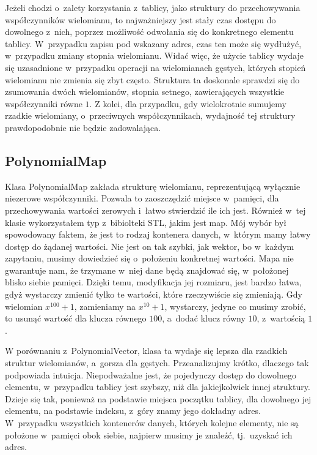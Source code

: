 Jeżeli chodzi o~zalety korzystania z~tablicy, jako struktury do przechowywania współczynników wielomianu, to najważniejszy jest stały czas dostępu do dowolnego z~nich, poprzez możliwość odwołania się do konkretnego elementu tablicy. W~przypadku zapisu pod wskazany adres, czas ten może się wydłużyć, w~przypadku zmiany stopnia wielomianu. Widać więc, że użycie tablicy wydaje się uzasadnione w~przypadku operacji na wielomianach gęstych, których stopień wielomianu nie zmienia się zbyt często. Struktura ta doskonale sprawdzi się do zsumowania dwóch wielomianów, stopnia setnego, zawierających wszystkie współczynniki równe $1$. Z kolei, dla przypadku, gdy wielokrotnie sumujemy rzadkie wielomiany, o~przeciwnych współczynnikach, wydajność tej struktury prawdopodobnie nie będzie zadowalająca.

\subsection{PolynomialMap}

Klasa PolynomialMap zakłada strukturę wielomianu, reprezentującą wyłącznie niezerowe współczynniki.
Pozwala to zaoszczędzić miejsce w~pamięci, dla przechowywania wartości zerowych i~łatwo stwierdzić ile ich jest. Również w~tej klasie wykorzystałem typ z~bibiolteki STL, jakim jest map. Mój wybór był spowodowany faktem, że jest to rodzaj kontenera danych, w~którym mamy łatwy dostęp do żądanej wartości. Nie jest on tak szybki, jak wektor, bo w~każdym zapytaniu, musimy dowiedzieć się o~położeniu konkretnej wartości. Mapa nie gwarantuje nam, że trzymane w~niej dane będą znajdować się, w~położonej blisko siebie pamięci. Dzięki temu, modyfikacja jej rozmiaru, jest bardzo łatwa, gdyż wystarczy zmienić tylko te wartości, które rzeczywiście się zmieniają. Gdy wielomian $x^{100} + 1$, zamieniamy na $x^{10} + 1$, wystarczy, jedyne co musimy zrobić, to usunąć wartość dla klucza równego $100$, a~dodać klucz równy $10$, z~wartością $1$.

W porównaniu z~PolynomialVector, klasa ta wydaje się lepsza dla rzadkich struktur wielomianów, a~gorsza dla gęstych. Przeanalizujmy krótko, dlaczego tak podpowiada intuicja. Niepodważalne jest, że pojedynczy dostęp do dowolnego elementu, w~przypadku tablicy jest szybszy, niż dla jakiejkolwiek innej struktury. Dzieje się tak, ponieważ na podstawie miejsca początku tablicy, dla dowolnego jej elementu, na podstawie indeksu, z~góry znamy jego dokładny adres. W~przypadku wszystkich kontenerów danych, których kolejne elementy, nie są położone w~pamięci obok siebie, najpierw musimy je znaleźć, tj.\ uzyskać ich adres.

